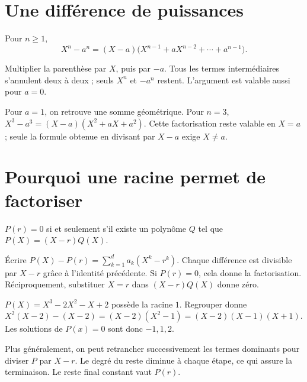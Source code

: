 \documentclass[../cours_1re.tex]{subfiles}
\begin{document}
\section{Une différence de puissances}
\begin{theoreme}
Pour $n\ge1$,
\[
X^n-a^n=(X-a)\bigl(X^{n-1}+aX^{n-2}+\cdots+a^{n-1}\bigr).
\]
\end{theoreme}
\begin{demonstration}
Multiplier la parenthèse par $X$, puis par $-a$. Tous les termes intermédiaires s'annulent deux à deux ; seuls $X^n$ et $-a^n$ restent. L'argument est valable aussi pour $a=0$.
\end{demonstration}
Pour $a=1$, on retrouve une somme géométrique. Pour $n=3$, $X^3-a^3=(X-a)(X^2+aX+a^2)$.
Cette factorisation reste valable en $X=a$ ; seule la formule obtenue en divisant par $X-a$ exige $X\ne a$.
\section{Pourquoi une racine permet de factoriser}
\begin{theoreme}
$P(r)=0$ si et seulement s'il existe un polynôme $Q$ tel que $P(X)=(X-r)Q(X)$.
\end{theoreme}
\begin{demonstration}
Écrire $P(X)-P(r)=\sum_{k=1}^d a_k(X^k-r^k)$. Chaque différence est divisible par $X-r$ grâce à l'identité précédente. Si $P(r)=0$, cela donne la factorisation. Réciproquement, substituer $X=r$ dans $(X-r)Q(X)$ donne zéro.
\end{demonstration}
\begin{exemple}
$P(X)=X^3-2X^2-X+2$ possède la racine $1$. Regrouper donne
$X^2(X-2)-(X-2)=(X-2)(X^2-1)=(X-2)(X-1)(X+1)$.
Les solutions de $P(x)=0$ sont donc $-1,1,2$.
\end{exemple}
\approfondissement Plus généralement, on peut retrancher successivement les termes dominants pour diviser $P$ par $X-r$. Le degré du reste diminue à chaque étape, ce qui assure la terminaison. Le reste final constant vaut $P(r)$.
\end{document}
